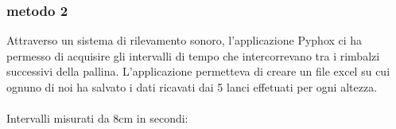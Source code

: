 \documentclass[a4paper]{article}
\theoremstyle{definition}
\begin{document}
	\subsubsection*{metodo 2}
	Attraverso un sistema di rilevamento sonoro, l'applicazione Pyphox ci ha permesso di acquisire gli intervalli di tempo che intercorrevano tra i rimbalzi successivi della pallina. L'applicazione permetteva di creare un file excel su cui ognuno di noi ha salvato i dati ricavati dai 5 lanci effetuati per ogni altezza.\\\\
	Intervalli misurati da 8cm in secondi:
	\begin{figure}[!h]
	\end{figure}
\end{document}
